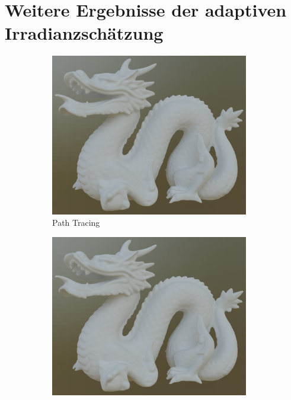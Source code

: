 \section{Weitere Ergebnisse der adaptiven Irradianzschätzung} %
\label{sec:ergebnisse_adaptive_irradianzschaetzung}

	\begin{figure}[h]
		\begin{subfigure}[t]{0.33\textwidth}
			\center
			\includegraphics[width=0.95\textwidth]{pic/irr_est-ra-dragon-ref.png}
			\caption{Path Tracing}
			\label{subfig:irr-est-ra-dragon-ref}
		\end{subfigure}
		\begin{subfigure}[t]{0.33\textwidth}
			\center
			\includegraphics[width=0.95\textwidth]{pic/irr_est-ra-dragon-irr.png}

\end{subfigure}
\end{figure}
